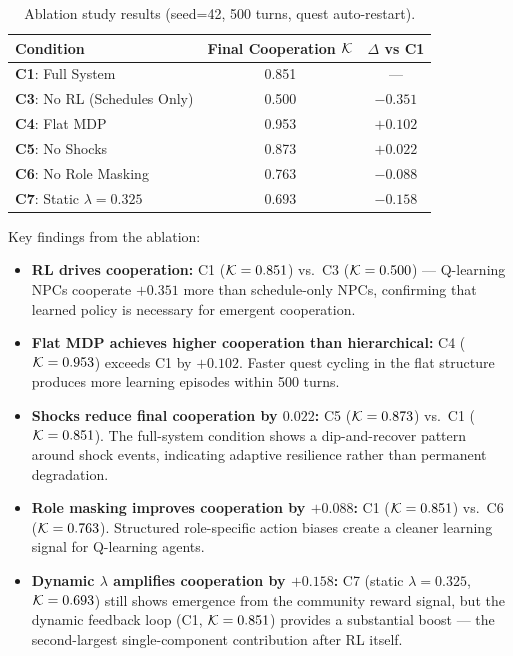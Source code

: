 \begin{table}[ht]
\centering
\caption{Ablation study results (seed=42, 500 turns, quest auto-restart).}
\label{tab:ablation_results}
\begin{tabular}{@{}lcc@{}}
\toprule
Condition & Final Cooperation $\mathcal{K}$ & $\Delta$ vs C1 \\
\midrule
\textbf{C1}: Full System              & 0.851 & --- \\
\textbf{C3}: No RL (Schedules Only)   & 0.500 & $-0.351$ \\
\textbf{C4}: Flat MDP                 & 0.953 & $+0.102$ \\
\textbf{C5}: No Shocks                & 0.873 & $+0.022$ \\
\textbf{C6}: No Role Masking          & 0.763 & $-0.088$ \\
\textbf{C7}: Static $\lambda = 0.325$ & 0.693 & $-0.158$ \\
\bottomrule
\end{tabular}
\end{table}

Key findings from the ablation:
\begin{itemize}
    \item \textbf{RL drives cooperation:} C1 ($\mathcal{K} = 0.851$) vs.\ C3 ($\mathcal{K} = 0.500$) --- Q-learning NPCs cooperate $+0.351$ more than schedule-only NPCs, confirming that learned policy is necessary for emergent cooperation.
    \item \textbf{Flat MDP achieves higher cooperation than hierarchical:} C4 ($\mathcal{K} = 0.953$) exceeds C1 by $+0.102$. Faster quest cycling in the flat structure produces more learning episodes within 500 turns.
    \item \textbf{Shocks reduce final cooperation by $0.022$:} C5 ($\mathcal{K} = 0.873$) vs.\ C1 ($\mathcal{K} = 0.851$). The full-system condition shows a dip-and-recover pattern around shock events, indicating adaptive resilience rather than permanent degradation.
    \item \textbf{Role masking improves cooperation by $+0.088$:} C1 ($\mathcal{K} = 0.851$) vs.\ C6 ($\mathcal{K} = 0.763$). Structured role-specific action biases create a cleaner learning signal for Q-learning agents.
    \item \textbf{Dynamic $\lambda$ amplifies cooperation by $+0.158$:} C7 (static $\lambda = 0.325$, $\mathcal{K} = 0.693$) still shows emergence from the community reward signal, but the dynamic feedback loop (C1, $\mathcal{K} = 0.851$) provides a substantial boost --- the second-largest single-component contribution after RL itself.
\end{itemize}

